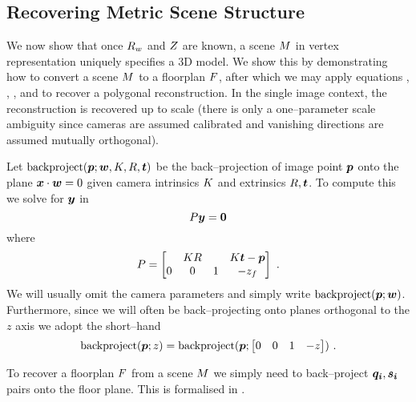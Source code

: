 \subsection{Recovering Metric Scene Structure}
\label{sec:metric-recovery}

We now show that once $\SceneR$ and $\Zs$ are known, a scene $\Scene$
in vertex representation uniquely specifies a 3D model. We show this
by demonstrating how to convert a scene $\Scene$ to a floorplan
$\Floorplan$, after which we may apply equations ,
, , and  to recover a polygonal
reconstruction. In the single image context, the reconstruction is
recovered up to scale (there is only a one--parameter scale
ambiguity since cameras are assumed calibrated and vanishing
directions are assumed mutually orthogonal). 

Let $\backproj(\Pixel;\vect{w},\CamMatrix,\CamR,\CamTr)$ be the
back--projection of image point $\Pixel$ onto the plane
$\vect{x}\cdot\vect{w}=0$ given camera intrinsics $\CamMatrix$ and
extrinsics $\CamR,\CamTr$. To compute this we solve for $\vect{y}$ in
\begin{equation}
  P \vect{y} = \vect{0}
\end{equation}
where
\begin{equation}
  P =
  \begin{bmatrix}
    & \CamMatrix\CamR & & \CamMatrix\CamTr-\Pixel \\
    0 & 0 & 1 & -\zfloor
  \end{bmatrix}~.
\end{equation}
We will usually omit the camera parameters and simply write
$\backproj(\Pixel;\vect{w})$. Furthermore, since we will often be
back--projecting onto planes orthogonal to the $z$ axis we adopt the
short--hand
\begin{equation}
  \backproj(\Pixel;z) = \backproj(\Pixel;
    \begin{bmatrix}0 & 0 & 1 & -z\end{bmatrix}) ~.
\end{equation}

To recover a floorplan $\Floorplan$ from a scene $\Scene$ we simply
need to back--project $\vect{q_i},\vect{s_i}$ pairs onto the floor
plane. This is formalised in .

